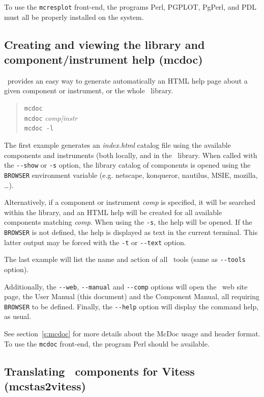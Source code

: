 To use the \verb+mcresplot+ front-end, the programs Perl, PGPLOT, PgPerl,
and PDL must all be properly installed on the system.

\subsection{Creating and viewing the library and component/instrument help (mcdoc)}
\label{s:mcdoc-run}

\MCS\ provides an easy way to generate automatically an HTML help page about a given component or instrument, or the whole \MCS\ library. 
\begin{quote}
  \verb|mcdoc|\\
  \verb|mcdoc| {\it comp|instr}\\
  \verb|mcdoc -l|
\end{quote}
The first example generates an {\it index.html} catalog file using the available components and instruments (both locally, and in the \MCS\ library. When called with the \verb+--show+ or \verb+-s+ option, the library catalog of components is opened using the \verb+BROWSER+ environment variable  (e.g. netscape, konqueror, nautilus, MSIE, mozilla, \ldots).

Alternatively, if a component or instrument {\it comp} is specified, it will be searched within the library, and an HTML help will be created for all available components matching {\it comp}. When using the \verb+-s+, the help will be opened. If the \verb+BROWSER+ is not defined, the help is displayed as text in the current terminal. This latter output may be forced with the \verb+-t+ or \verb+--text+ option.

The last example will list the name and action of all \MCS\ tools (same as \verb+--tools+ option).

Additionally, the \verb+--web+, \verb+--manual+ and \verb+--comp+ options will open the \MCS\ web site page, the User Manual (this document) and the Component Manual, all requiring \verb+BROWSER+ to be defined. Finally, the \verb+--help+ option will display the command help, as usual.

See section~\ref{s:mcdoc} for more details about the McDoc usage and header format.
To use the \verb+mcdoc+ front-end, the program Perl should be available.

\subsection{Translating \MCS\ components for Vitess (mcstas2vitess)}
\label{s:mcstas2vitess}

